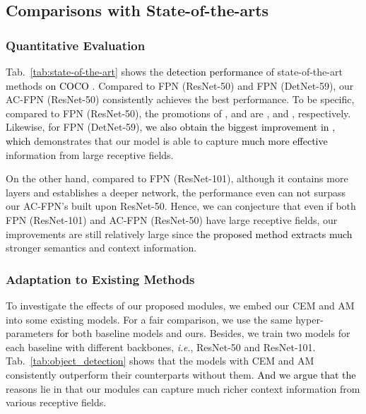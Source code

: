 \documentclass[journal]{IEEEtran}
\newcommand{\ie}{\textit{i}.\textit{e}.\xspace}
\def\qcr{\fontfamily{qcr}\selectfont}
\def\myblue{\textcolor{black}}
\begin{document}
	
	
	\subsection{Comparisons with State-of-the-arts}
	
	
	\subsubsection{Quantitative Evaluation}
	
	
	Tab.~\ref{tab:state-of-the-art} shows the \myblue{detection performance} of state-of-the-art methods \myblue{on COCO {\qcr{test-dev}}}. Compared to FPN (ResNet-50) and FPN (DetNet-59), our AC-FPN (ResNet-50) consistently achieves the best performance. To be specific, compared to FPN (ResNet-50), the promotions of ,  and  are ,  and , respectively. Likewise, for FPN (DetNet-59), 
	\myblue{we also obtain the biggest improvement in , which}
demonstrates that our model is able to capture \myblue{much more effective} information from large receptive fields. 

	
	
	
	
	On the other hand, compared to FPN (ResNet-101), although it contains more layers and establishes a deeper network, the performance even can not surpass our AC-FPN's built upon ResNet-50. Hence, we can conjecture that even if both FPN (ResNet-101) and AC-FPN (ResNet-50) have large receptive fields, our improvements are still relatively large since \myblue{the proposed method extracts much} stronger semantics and context information.
	
	


\subsubsection{Adaptation to Existing Methods}
	
	To investigate the effects of our proposed modules, we embed our CEM and AM into some existing models. For a fair comparison, we use the same hyper-parameters \myblue{for} both baseline models and ours. Besides, we train two models for each baseline with different backbones, \ie, ResNet-50 and ResNet-101. 
Tab.~\ref{tab:object_detection} shows that the models with CEM and AM consistently outperform their counterparts without them. \myblue{And we argue that the} reasons lie in that our modules can capture much richer context information from various receptive fields.
\end{document}
